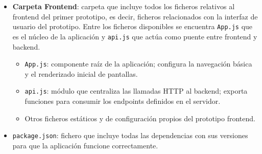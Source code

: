 \begin{itemize}
\begin{itemize}
\begin{itemize}
\begin{itemize}
                \item \texttt{server.js}: punto de entrada del servidor; configura el servidor Express, middleware (CORS, body-parser), registra las rutas y arranca la aplicación en el puerto configurado.
            \end{itemize}
            \item \texttt{package.json}: fichero que declara las dependencias del backend, scripts de ejecución y metadatos del proyecto.
        \end{itemize}
        \item \textbf{Carpeta Frontend}: carpeta que incluye todos los ficheros relativos al frontend del primer prototipo, es decir, ficheros relacionados con la interfaz de usuario del prototipo. Entre los ficheros disponibles se encuentra \texttt{App.js} que es el núcleo de la aplicación y \texttt{api.js} que actúa como puente entre frontend y backend.
        \begin{itemize}
            \item \texttt{App.js}: componente raíz de la aplicación; configura la navegación básica y el renderizado inicial de pantallas.
            \item \texttt{api.js}: módulo que centraliza las llamadas HTTP al backend; exporta funciones para consumir los endpoints definidos en el servidor.
            \item Otros ficheros estáticos y de configuración propios del prototipo frontend.
        \end{itemize}
        \item \texttt{package.json}: fichero que incluye todas las dependencias con sus versiones para que la aplicación funcione correctamente.
    \end{itemize}


\end{itemize}
